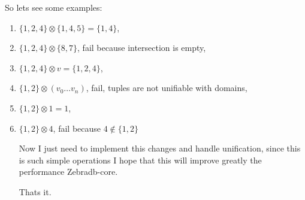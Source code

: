 \documentclass{article}
\begin{document}
So lets see some examples:

\begin{enumerate}
\item $\{1, 2, 4\} \otimes \{1, 4, 5\} = \{1, 4\}$,
\item $\{1, 2, 4\} \otimes \{8, 7\}$, fail because intersection is empty,
\item $\{1, 2, 4\} \otimes v = \{1, 2, 4\}$,
\item $\{1, 2\} \otimes (v_{0} \ldots v_{n})$, fail, tuples are not unifiable with domains,
\item $\{1, 2\} \otimes 1 = 1$,
\item $\{1, 2\} \otimes 4$, fail because $4 \not\in \{1, 2\}$

Now I just need to implement this changes and handle unification, since this is such simple operations I hope 
that this will improve greatly the performance Zebradb-core.

Thats it.

\end{enumerate}
\end{document}
